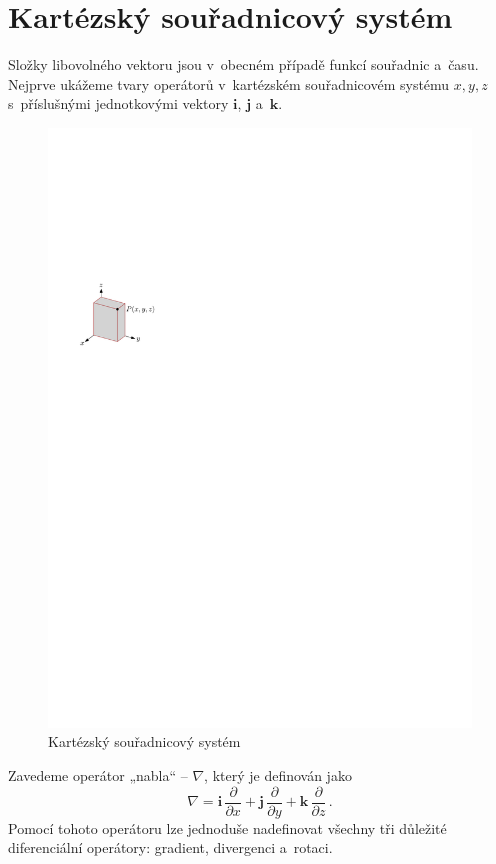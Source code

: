 \section{Kartézský souřadnicový systém}
\label{appendix:vektorova_analyza}

Složky libovolného vektoru jsou v~obecném případě funkcí souřadnic a~času. Nejprve ukážeme tvary operátorů v~kartézském souřadnicovém systému $x, y, z$ s~příslušnými jednotkovými vektory $\mathbf{i}$, $\mathbf{j}$ a~$\mathbf{k}$.

\begin{figure}[!hbt]
\centering
\includegraphics[]{prilohy/vektorova_analyza/kartezsky.pdf}
\caption{Kartézský souřadnicový systém}
\label{fig:vektorova_analyza_kartezsky}
\end{figure}

Zavedeme operátor „nabla“ -- $\nabla$, který je definován jako
$$
\nabla = \mathbf{i}\,\frac{\partial}{\partial x} + \mathbf{j}\,\frac{\partial}{\partial y} + \mathbf{k}\,\frac{\partial}{\partial z}\,.
$$
Pomocí tohoto operátoru lze jednoduše nadefinovat všechny tři důležité diferenciální operátory: gradient, divergenci a~rotaci.

